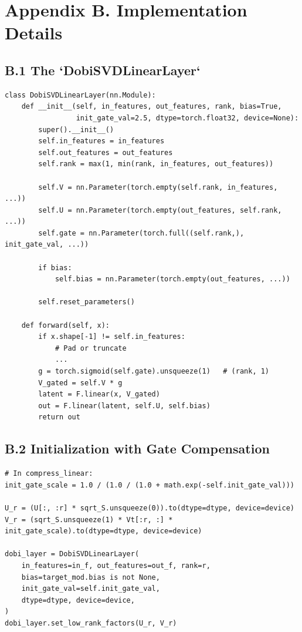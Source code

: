 
\section{Appendix B. Implementation Details}

\subsection{B.1 The `DobiSVDLinearLayer`}

\begin{lstlisting}
class DobiSVDLinearLayer(nn.Module):
    def __init__(self, in_features, out_features, rank, bias=True,
                 init_gate_val=2.5, dtype=torch.float32, device=None):
        super().__init__()
        self.in_features = in_features
        self.out_features = out_features
        self.rank = max(1, min(rank, in_features, out_features))
        
        self.V = nn.Parameter(torch.empty(self.rank, in_features, ...))
        self.U = nn.Parameter(torch.empty(out_features, self.rank, ...))
        self.gate = nn.Parameter(torch.full((self.rank,), init_gate_val, ...))
        
        if bias:
            self.bias = nn.Parameter(torch.empty(out_features, ...))
        
        self.reset_parameters()
    
    def forward(self, x):
        if x.shape[-1] != self.in_features:
            # Pad or truncate
            ...
        g = torch.sigmoid(self.gate).unsqueeze(1)   # (rank, 1)
        V_gated = self.V * g
        latent = F.linear(x, V_gated)
        out = F.linear(latent, self.U, self.bias)
        return out
\end{lstlisting}

\subsection{B.2 Initialization with Gate Compensation}

\begin{lstlisting}
# In compress_linear:
init_gate_scale = 1.0 / (1.0 / (1.0 + math.exp(-self.init_gate_val)))

U_r = (U[:, :r] * sqrt_S.unsqueeze(0)).to(dtype=dtype, device=device)
V_r = (sqrt_S.unsqueeze(1) * Vt[:r, :] * init_gate_scale).to(dtype=dtype, device=device)

dobi_layer = DobiSVDLinearLayer(
    in_features=in_f, out_features=out_f, rank=r,
    bias=target_mod.bias is not None,
    init_gate_val=self.init_gate_val,
    dtype=dtype, device=device,
)
dobi_layer.set_low_rank_factors(U_r, V_r)
\end{lstlisting}

